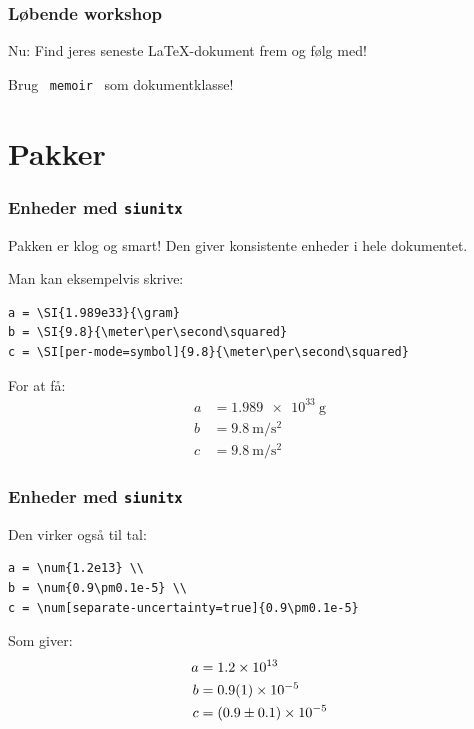 \documentclass{beamer}
\begin{document}
\begin{frame}
  \frametitle{Løbende workshop}

  Nu: Find jeres seneste \LaTeX-dokument frem og følg med!
\end{frame}


\begin{frame}[standout]
  Brug \  \texttt{memoir} \ som dokumentklasse!
\end{frame}


\section{Pakker}

\begin{frame}[fragile]
  \frametitle{Enheder med \texttt{siunitx}}

  Pakken er klog og \alert{smart}! Den giver konsistente enheder i hele
  dokumentet.

  Man kan eksempelvis skrive:

  {\fontsize{9pt}{11pt}\selectfont
\begin{verbatim}
a = \SI{1.989e33}{\gram}
b = \SI{9.8}{\meter\per\second\squared}
c = \SI[per-mode=symbol]{9.8}{\meter\per\second\squared}
\end{verbatim}
    }

    For at få:
  \begin{align*}
    a &= \SI{1.989e33}{\gram} \\
    b &= \SI{9.8}{\meter\per\second\squared} \\
    c &= \SI[per-mode=symbol]{9.8}{\meter\per\second\squared}
  \end{align*}
\end{frame}


\begin{frame}[fragile]
  \frametitle{Enheder med \texttt{siunitx}}

  Den virker også til tal:

  {\fontsize{9pt}{11pt}\selectfont
\begin{verbatim}
a = \num{1.2e13} \\
b = \num{0.9\pm0.1e-5} \\
c = \num[separate-uncertainty=true]{0.9\pm0.1e-5}
\end{verbatim}
  }

  Som giver:
  \begin{align*}
    a &= \num{1.2e13} \\
    b &= \num{0.9\pm0.1e-5} \\
    c &= \num[separate-uncertainty=true]{0.9\pm0.1e-5}
  \end{align*}
\end{frame}
\end{document}
